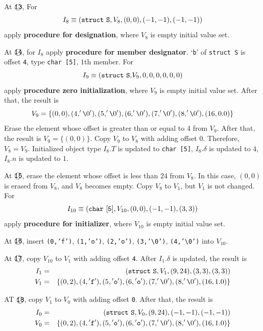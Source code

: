 \begin{Example}
\noindent
At $\MARU{\tt 13}$, For
\[
I_8 \equiv ({\tt struct\,\,S}, V_8, (0,0), (-1,-1),(-1,-1))
\]
apply
{\bf procedure for designation}, where $V_8$ is empty initial value set.

\noindent
At $\MARU{\tt 14}$, for $I_8$ apply
{\bf procedure for member designator}.
`{\tt b}' of {\tt struct S} is offset {\tt{4}}, 
type {\tt char [5]}, $1$th member.
For
\[
 I_9 \equiv ({\tt{struct\,\,S},}V_9,0,0,0,0,0,0)
\]
apply {\bf procedure zero initialization}, where $V_9$ is empty initial
value set.
After that, the result is
\[
V_9 = \{ (0,0), (4,'\verb|\|0'), (5,'\verb|\|0'), (6,'\verb|\|0'),
           (7,'\verb|\|0'), (8,'\verb|\|0'), (16,0.0)    \}
\]
Erase the element whose offset is greater than or equal to $4$ from $V_9$.
After that, the result is $V_9 = \{(0,0)\}$.
Copy $V_9$ to $V_8$ with adding offset $0$.
Therefore, $V_8 = V_9$.
Initialized object type $I_8.T$ is updated to {\tt{char [5]}},
$I_8.{\delta}$ is updated to $4$,
$I_8.n$ is updated to $1$.

\noindent
At $\MARU{\tt 15}$, erase the element whose offset is less than $24$
from $V_8$. In this case, $(0,0)$ is erased from $V_8$, and $V_8$
 becomes empty.
Copy $V_8$ to $V_1$, but $V_1$ is not changed.
For
\[
I_{10} \equiv ({\tt{char\,\,[5]}}, V_{10}, (0,0), (-1,-1), (3,3))
\]
apply {\bf procedure for initializer}, where $V_{10}$
is empty initial value set.

\noindent
At $\MARU{\tt 16}$, insert
{\tt (0,'f')},
{\tt (1,'o')},
{\tt (2,'o')},
{\tt (3,'\verb|\|0')},
{\tt (4,'\verb|\|0')}
into $V_{10}$.

\noindent
At $\MARU{\tt 17}$,
copy $V_{10}$ to $V_1$ with adding offset {\tt{4}}.
After $I_1.\delta$ is updated, the result is
\begin{eqnarray*}
I_1 & = & ({\tt{struct\,\,S}},V_1,(9,24),(3,3),(3,3))  \\
V_1 & = & \{ (0,2), (4,{\tt{'f'}}), (5,{\tt{'o'}}), (6,{\tt{'o'}}),
        (7,'\verb|\|0'), (8,'\verb|\|0'), (16,1.0)    \}
\end{eqnarray*}

\noindent
AT $\MARU{\tt 18}$,
copy $V_1$ to $V_0$ with adding offset {\tt 0}.
After that, the result is
\begin{eqnarray*}
I_0 & = & ({\tt{struct\,\,S}},V_0,(9,24),(-1,-1),(-1,-1))  \\
V_0 & = & \{ (0,2), (4,{\tt{'f'}}), (5,{\tt{'o'}}), (6,{\tt{'o'}}),
        (7,'\verb|\|0'), (8,'\verb|\|0'), (16,1.0)  \}
\end{eqnarray*}
\end{Example}

